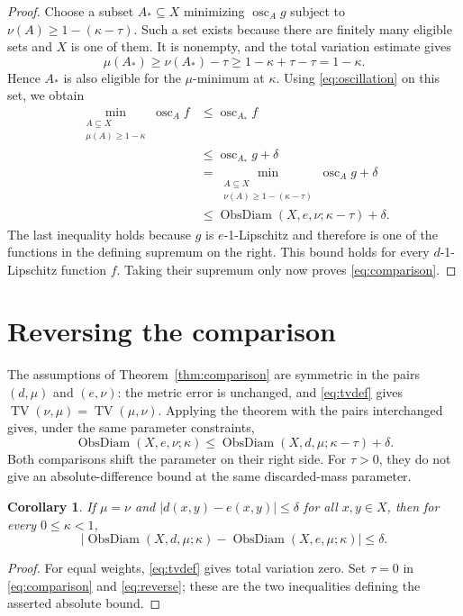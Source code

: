 \documentclass[a4paper,11pt]{article}
\newtheorem{corollary}[theorem]{Corollary}
\DeclareMathOperator{\ObsDiam}{ObsDiam}
\DeclareMathOperator{\osc}{osc}
\DeclareMathOperator{\TV}{TV}
\begin{document}
\begin{proof}
Choose a subset $A_*\subseteq X$ minimizing $\osc_A g$ subject to
$\nu(A)\ge1-(\kappa-\tau)$. Such a set exists because there are
finitely many eligible sets and $X$ is one of them. It is nonempty,
and the total variation estimate gives
\[
 \mu(A_*)\ge\nu(A_*)-\tau
 \ge1-\kappa+\tau-\tau=1-\kappa.
\]
Hence $A_*$ is also eligible for the $\mu$-minimum at $\kappa$.
Using \eqref{eq:oscillation} on this set, we obtain
\begin{align*}
 \min_{\substack{A\subseteq X\\\mu(A)\ge1-\kappa}}\osc_A f
 &\le\osc_{A_*}f\\
 &\le\osc_{A_*}g+\delta\\
 &=\min_{\substack{A\subseteq X\\\nu(A)\ge1-(\kappa-\tau)}}
       \osc_A g+\delta\\
 &\le\ObsDiam(X,e,\nu;\kappa-\tau)+\delta.
\end{align*}
The last inequality holds because $g$ is $e$-1-Lipschitz and therefore
is one of the functions in the defining supremum on the right.
This bound holds for every $d$-1-Lipschitz function $f$. Taking their
supremum only now proves \eqref{eq:comparison}.
\end{proof}

\section{Reversing the comparison}

The assumptions of Theorem~\ref{thm:comparison} are symmetric in the
pairs $(d,\mu)$ and $(e,\nu)$: the metric error is unchanged, and
\eqref{eq:tvdef} gives $\TV(\nu,\mu)=\TV(\mu,\nu)$. Applying the
theorem with the pairs interchanged gives, under the same parameter
constraints,
\begin{equation}\label{eq:reverse}
 \ObsDiam(X,e,\nu;\kappa)
 \le\ObsDiam(X,d,\mu;\kappa-\tau)+\delta.
\end{equation}
Both comparisons shift the parameter on their right side. For
$\tau>0$, they do not give an absolute-difference bound at the same
discarded-mass parameter.

\begin{corollary}\label{cor:metric}
If $\mu=\nu$ and $|d(x,y)-e(x,y)|\le\delta$ for all $x,y\in X$, then
for every $0\le\kappa<1$,
\[
 \bigl|\ObsDiam(X,d,\mu;\kappa)
       -\ObsDiam(X,e,\mu;\kappa)\bigr|\le\delta.
\]
\end{corollary}

\begin{proof}
For equal weights, \eqref{eq:tvdef} gives total variation zero.
Set $\tau=0$ in \eqref{eq:comparison} and \eqref{eq:reverse}; these
are the two inequalities defining the asserted absolute bound.
\end{proof}
\end{document}
